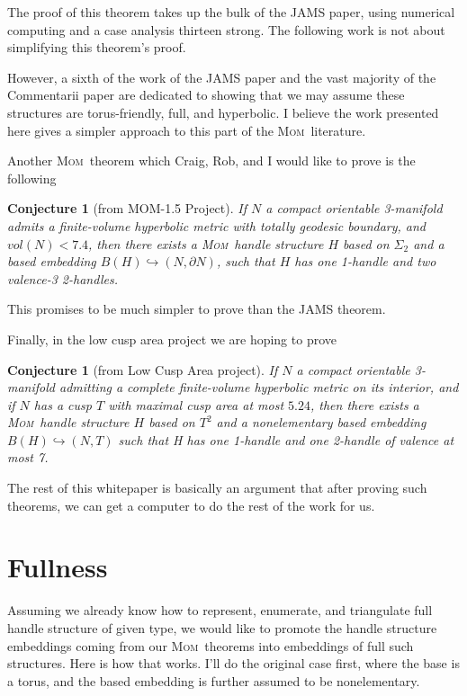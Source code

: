 \documentclass{article}
\theoremstyle{plain}
\newtheorem{conjecture}[theorem]{Conjecture}
\theoremstyle{plain}
\theoremstyle{definition}
\numberwithin{equation}{section}
\newcommand{\MOM}{\textsc{Mom}}
\begin{document}
The proof of this theorem takes up the bulk of the JAMS paper,
using numerical computing and a case analysis thirteen strong.
The following work is not about simplifying this theorem's proof.

However, a sixth of the work of the JAMS paper and the vast 
majority of the Commentarii paper are dedicated to showing that
we may assume these structures are torus-friendly, full,
and hyperbolic. I believe the work presented here gives a
simpler approach to this part of the \MOM\ literature.

Another \MOM\ theorem which Craig, Rob, and I would like
to prove is the following
\begin{conjecture}[from MOM-1.5 Project]
If $N$ a compact orientable 3-manifold
admits a finite-volume hyperbolic metric with totally geodesic
boundary, and $vol(N) < 7.4$, then there exists a \MOM\ handle
structure $H$ based on $\Sigma_2$ and a based embedding
$B(H) \hookrightarrow (N,\partial N)$, such that $H$
has one 1-handle and two valence-3 2-handles.
\end{conjecture}

This promises to be much simpler to prove than the JAMS theorem.

Finally, in the low cusp area project we are hoping to prove
\begin{conjecture}[from Low Cusp Area project]
If $N$ a compact orientable 3-manifold admitting a
complete finite-volume hyperbolic metric on its interior,
and if $N$ has a cusp $T$ with maximal cusp area at most
$5.24$, then there exists a \MOM\ handle structure $H$
based on $T^2$ and a nonelementary based embedding $B(H) \hookrightarrow (N,T)$
such that H has one 1-handle and one 2-handle of valence at most 7.
\end{conjecture}

The rest of this whitepaper is basically an argument
that after proving such theorems, we can get a computer
to do the rest of the work for us.

\section{Fullness}
Assuming we already know how to represent, enumerate,
and triangulate full handle structure of given type,
we would like to promote the handle structure embeddings
coming from our \MOM\ theorems into embeddings of
full such structures. Here is how that works. I'll do
the original case first, where the base is a torus,
and the based embedding is further assumed to be nonelementary.
\end{document}
